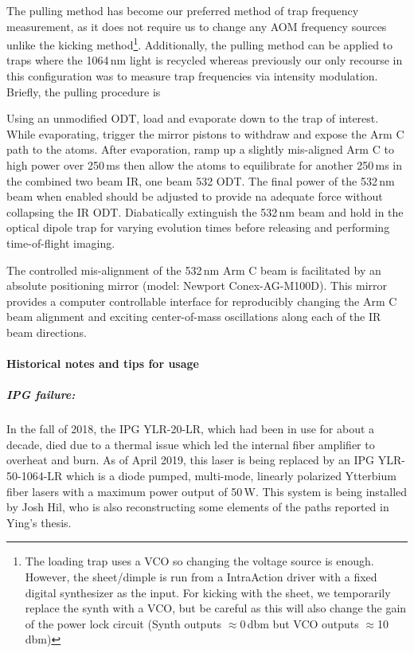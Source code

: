 The pulling method has become our preferred method of trap frequency measurement, as it does not require us to change any AOM frequency sources unlike the kicking method\footnote{The loading trap uses a VCO so changing the voltage source is enough. However, the sheet/dimple is run from a IntraAction driver with a fixed digital synthesizer as the input. For kicking with the sheet, we temporarily replace the synth with a VCO, but be careful as this will also change the gain of the power lock circuit (Synth outputs $\approx$0\,dbm but VCO outputs $\approx$10\,dbm)}.
Additionally, the pulling method can be applied to traps where the 1064\,nm light is recycled whereas previously our only recourse in this configuration was to measure trap frequencies via intensity modulation.
Briefly, the pulling procedure is 
\begin{outline}[enumerate]
	\1 Using an unmodified ODT, load and evaporate down to the trap of interest.
		\2 While evaporating, trigger the mirror pistons to withdraw and expose the Arm C path to the atoms.
	\1 After evaporation, ramp up a slightly mis-aligned Arm C to high power over 250\,ms then allow the atoms to equilibrate for another 250\,ms in the combined two beam IR, one beam 532 ODT.
		\2 The final power of the 532\,nm beam when enabled should be adjusted to provide na adequate force without collapsing the IR ODT.
	\1 Diabatically extinguish the 532\,nm beam and hold in the optical dipole trap for varying evolution times before releasing and performing time-of-flight imaging.
\end{outline}
The controlled mis-alignment of the 532\,nm Arm C beam is facilitated by an absolute positioning mirror (model: Newport Conex-AG-M100D).
This mirror provides a computer controllable interface for reproducibly changing the Arm C beam alignment and exciting center-of-mass oscillations along each of the IR beam directions.

\paragraph{Historical notes and tips for usage}
\subparagraph{IPG failure:}
In the fall of 2018, the IPG YLR-20-LR, which had been in use for about a decade, died due to a thermal issue which led the internal fiber amplifier to overheat and burn.
As of April 2019, this laser is being replaced by an IPG YLR-50-1064-LR which is a diode pumped, multi-mode, linearly polarized Ytterbium fiber lasers with a maximum power output of 50\,W.
This system is being installed by Josh Hil, who is also reconstructing some elements of the paths reported in Ying's thesis.

